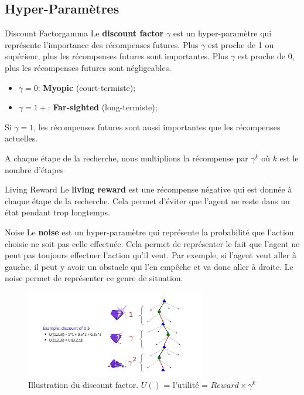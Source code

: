 \subsection{Hyper-Paramètres} %
\label{sub:hyper_parametres}

\begin{definition}{Discount Factor}{gamma}
    Le \textbf{discount factor} $\gamma$ est un hyper-paramètre qui représente l'importance des récompenses futures. 
    Plus $\gamma$ est proche de 1 ou supérieur, plus les récompenses futures sont importantes.
    Plus $\gamma$ est proche de 0, plus les récompenses futures sont négligeables. 
    \begin{itemize}
        \item $\gamma = 0$: \textbf{Myopic} (court-termiste);
        \item $\gamma = 1+$: \textbf{Far-sighted} (long-termiste);
    \end{itemize}  
    Si $\gamma = 1$, les récompenses futures sont aussi importantes que les récompenses actuelles.

    A chaque étape de la recherche, nous multiplions la récompense par $\gamma^k$ où $k$ est le nombre d'étapes
\end{definition}

\begin{definition}{Living Reward}{}
    Le \textbf{living reward} est une récompense négative qui est donnée à chaque étape de la recherche. 
    Cela permet d'éviter que l'agent ne reste dans un état pendant trop longtemps.
\end{definition}

\begin{definition}{Noise}{}
    Le \textbf{noise} est un hyper-paramètre qui représente la probabilité que l'action choisie ne soit pas celle effectuée. 
    Cela permet de représenter le fait que l'agent ne peut pas toujours effectuer l'action qu'il veut. 
    Par exemple, si l'agent veut aller à gauche, il peut y avoir un obstacle qui l'en empêche et va donc aller à droite.
    Le noise permet de représenter ce genre de situation.
\end{definition}

\begin{figure}[H]
    \centering
    \includegraphics[width=0.7\textwidth]{pictures/discountfac.png}
    \caption{Illustration du discount factor. $U()$ = l'utilité = $Reward \times \gamma^k$}\label{fig:discountfac}
\end{figure}

